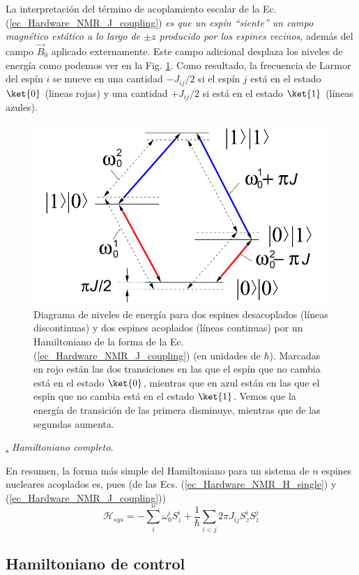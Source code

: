 \documentclass[a4paper,11pt]{book} %
\numberwithin{equation}{chapter}
\def\subsubiContadorIt{\par\addtocounter{subsubsection}{1}\underline{\it\thesubsubsection.}\hskip0.5cm \setcounter{subsubsubsectionIt}{0}}
\newcommand{\SubsubiIt}[1]{
		\subsubiContadorIt \textit{#1}
	}
\newcounter{subsubsubsectionIt}[subsubsection]
\begin{document}
\begin{itemize}
La interpretación del término de acoplamiento escalar de la Ec. (\ref{ec_Hardware_NMR_J_coupling})\textit{ es que un espín ``siente'' un campo magnético estático a lo largo de $\pm z$ producido por los espines vecinos}, además del campo $\vec{B}_0$ aplicado externamente. Este campo adicional desplaza los niveles de energía como podemos ver en la Fig. \ref{Fig_Harware_NMR_diagrama}. Como resultado, la frecuencia de Larmor del espín $i$ se mueve en una cantidad $-J_{ij}/2$ si el espín $j$ está en el estado $\ket{0}$ (lineas rojas) y una cantidad $+J_{ij}/2$ si está en el estado $\ket{1}$ (líneas azules).  

	\begin{figure}[H]
	\centering 
	\includegraphics[width=0.4\linewidth]{Figuras/Fig_Harware_NMR_diagrama.png}
	\caption{Diagrama de niveles de energía para dos espines desacoplados (líneas discontinuas) y dos espines acoplados (líneas continuas) por un Hamiltoniano de la forma de la Ec.	(\ref{ec_Hardware_NMR_J_coupling}) (en unidades de $\hbar$). Marcadas en rojo están las dos transiciones en las que el espín que no cambia está en el estado $\ket{0}$, mientras que en azul están en las que el espín que no cambia está en el estado $\ket{1}$. Vemos que la energía de transición de las primera disminuye, mientras que de las segundas aumenta.}
	\label{Fig_Harware_NMR_diagrama}
	\end{figure}

\end{itemize}

			\SubsubiIt{Hamiltoniano completo.}

En resumen, la forma más simple del Hamiltoniano para un sistema de $n$ espines nucleares acoplados es, pues (de las Ecs. (\ref{ec_Hardware_NMR_H_single}) y (\ref{ec_Hardware_NMR_J_coupling}))
	\begin{equation} \label{ec_Hardware_NMR_H_sys_final}
	\boxed{\mathcal{H}_{sys} = - \sum_{i}^n \omega_0^i S_z^{i}  + \frac{1}{\hbar} \sum_{i<j} 2 \pi J_{ij} S_z^i S_z^j}
	\end{equation}
	

		\subsection{Hamiltoniano de control} \label{sec_subsub_Harware_NMR_H_control}
\end{document}
